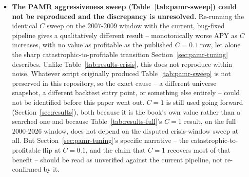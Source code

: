 \documentclass[11pt]{article}
\begin{document}
\begin{itemize}
{    against the ETF confirmation run.} The function skipped any
    reconstitution dated at
    or before the requested \texttt{start} instead of applying it, so
    any window that does not itself begin at 2000-01-01 silently kept
    the year-2000 roster for events that predate it. For the 2007-2009
    crisis window specifically, this meant AIG -- the window's single
    best-documented reconstitution -- was never added, while \texttt{T}
    (removed in the real 2004-04-08 reconstitution, before the crisis
    window even starts) stayed in the roster. Fixed by applying every
    event up to \texttt{start} without emitting a segment for it,
    rather than skipping it outright. The bug could not affect
    Table~\ref{tab:results-full} (that window starts at 2000-01-01,
    where no event predates \texttt{start}), and a full recheck of
    Table~\ref{tab:results-crisis} after the fix reproduced it within
    rounding noise -- that table was generated before the 2000-2026
    extension, from code with no reason to exhibit this bug. It does,
    however, call into question any crisis-window number computed
    \emph{after} that extension without this fix, which is the next
    item.
    \item \textbf{The PAMR aggressiveness sweep (Table~\ref{tab:pamr-sweep})
    could not be reproduced and the discrepancy is unresolved.}
    Re-running the identical $C$ sweep on the 2007-2009 window with the
    current, bug-fixed pipeline gives a qualitatively different result
    -- monotonically worse APY as $C$ increases, with no value as
    profitable as the published $C=0.1$ row, let alone the sharp
    catastrophic-to-profitable transition Section~\ref{sec:pamr-tuning}
    describes. Unlike Table~\ref{tab:results-crisis}, this does not
    reproduce within noise. Whatever script originally produced
    Table~\ref{tab:pamr-sweep} is not preserved in this repository, so
    the exact cause -- a different universe snapshot, a different
    backtest entry point, or something else entirely -- could not be
    identified before this paper went out. $C=1$ is still used going
    forward (Section~\ref{sec:results}), both because it is the book's
    own value rather than a searched one and because
    Table~\ref{tab:results-full}'s $C=1$ result, on the full
    2000-2026 window, does not depend on the disputed crisis-window
    sweep at all. But Section~\ref{sec:pamr-tuning}'s specific
    narrative -- the catastrophic-to-profitable flip at $C=0.1$, and the
    claim that $C=1$ recovers most of that benefit -- should be read as
    unverified against the current pipeline, not re-confirmed by it.

\end{itemize}
\end{document}
